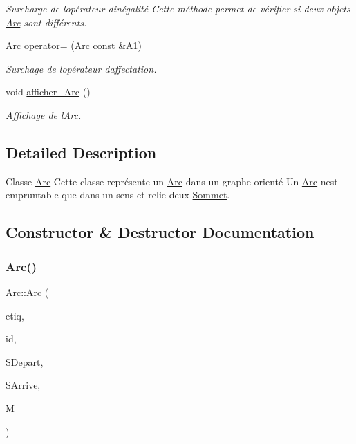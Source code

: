 \begin{DoxyCompactItemize}
\begin{DoxyCompactList}\small\item\em Surcharge de l\textquotesingle{}op\'{e}rateur d\textquotesingle{}in\'{e}galit\'{e} Cette m\'{e}thode permet de v\'{e}rifier si deux objets \hyperlink{classArc}{Arc} sont diff\'{e}rents. \end{DoxyCompactList}\item 
\mbox{\label{classArc_a3445d19a5132f810eca25a64b734eb05}} 
\hyperlink{classArc}{Arc} \hyperlink{classArc_a3445d19a5132f810eca25a64b734eb05}{operator=} (\hyperlink{classArc}{Arc} const \&A1)
\begin{DoxyCompactList}\small\item\em Surchage de l\textquotesingle{}op\'{e}rateur d\textquotesingle{}affectation. \end{DoxyCompactList}\item 
\mbox{\label{classArc_af5c38e122b600264ed551fb3819eef13}} 
void \hyperlink{classArc_af5c38e122b600264ed551fb3819eef13}{afficher\+\_\+\+Arc} ()
\begin{DoxyCompactList}\small\item\em Affichage de l\textquotesingle{}\hyperlink{classArc}{Arc}. \end{DoxyCompactList}\end{DoxyCompactItemize}


\subsection{Detailed Description}
Classe \hyperlink{classArc}{Arc} Cette classe repr\'{e}sente un \hyperlink{classArc}{Arc} dans un graphe orient\'{e} Un \hyperlink{classArc}{Arc} n\textquotesingle{}est empruntable que dans un sens et relie deux \hyperlink{classSommet}{Sommet}. 

\subsection{Constructor \& Destructor Documentation}
\mbox{\label{classArc_a9cf4b0264dc2409aafb36e6c2af7f7ff}} 
\subsubsection{\texorpdfstring{Arc()}{Arc()}\hspace{0.1cm}{\footnotesize\ttfamily [1/4]}}
{\footnotesize\ttfamily Arc\+::\+Arc (\begin{DoxyParamCaption}\item[{string}]{etiq,  }\item[{int}]{id,  }\item[{int}]{S\+Depart,  }\item[{int}]{S\+Arrive,  }\item[{map$<$ string, \hyperlink{structVectVal}{Vect\+Val} $>$}]{M }\end{DoxyParamCaption})}



